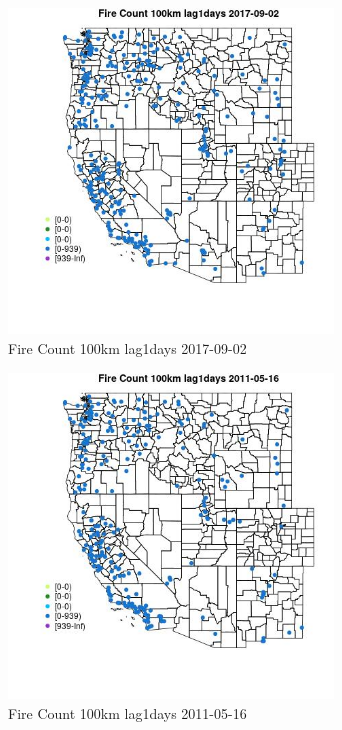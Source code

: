 \begin{figure} 
\centering  
\includegraphics[width=0.77\textwidth]{Code_Outputs/Report_ML_input_PM25_Step4_part_e_de_duplicated_aves_compiled_2019-05-21wNAs_MapObsFire_Count_100km_lag1days2017-09-02.jpg} 
\caption{\label{fig:Report_ML_input_PM25_Step4_part_e_de_duplicated_aves_compiled_2019-05-21wNAsMapObsFire_Count_100km_lag1days2017-09-02}Fire Count 100km lag1days 2017-09-02} 
\end{figure} 
 

\begin{figure} 
\centering  
\includegraphics[width=0.77\textwidth]{Code_Outputs/Report_ML_input_PM25_Step4_part_e_de_duplicated_aves_compiled_2019-05-21wNAs_MapObsFire_Count_100km_lag1days2011-05-16.jpg} 
\caption{\label{fig:Report_ML_input_PM25_Step4_part_e_de_duplicated_aves_compiled_2019-05-21wNAsMapObsFire_Count_100km_lag1days2011-05-16}Fire Count 100km lag1days 2011-05-16} 
\end{figure} 
 

